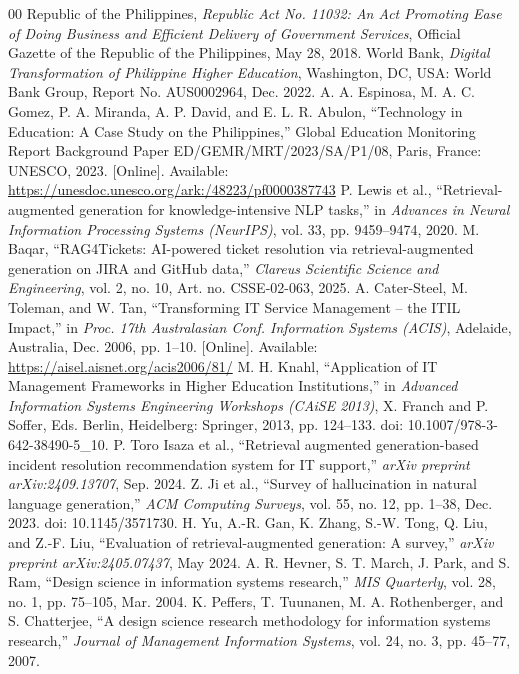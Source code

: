 \documentclass[conference]{IEEEtran}
\begin{document}
\begin{thebibliography}{00}
 Republic of the Philippines, \textit{Republic Act No. 11032: An Act Promoting Ease of Doing Business and Efficient Delivery of Government Services}, Official Gazette of the Republic of the Philippines, May 28, 2018.
 World Bank, \textit{Digital Transformation of Philippine Higher Education}, Washington, DC, USA: World Bank Group, Report No. AUS0002964, Dec. 2022.
 A. A. Espinosa, M. A. C. Gomez, P. A. Miranda, A. P. David, and E. L. R. Abulon, ``Technology in Education: A Case Study on the Philippines,'' Global Education Monitoring Report Background Paper ED/GEMR/MRT/2023/SA/P1/08, Paris, France: UNESCO, 2023. [Online]. Available: \url{https://unesdoc.unesco.org/ark:/48223/pf0000387743}
 P. Lewis et al., ``Retrieval-augmented generation for knowledge-intensive NLP tasks,'' in \textit{Advances in Neural Information Processing Systems (NeurIPS)}, vol. 33, pp. 9459--9474, 2020.
 M. Baqar, ``RAG4Tickets: AI-powered ticket resolution via retrieval-augmented generation on JIRA and GitHub data,'' \textit{Clareus Scientific Science and Engineering}, vol. 2, no. 10, Art. no. CSSE-02-063, 2025.
 A. Cater-Steel, M. Toleman, and W. Tan, ``Transforming IT Service Management -- the ITIL Impact,'' in \textit{Proc. 17th Australasian Conf. Information Systems (ACIS)}, Adelaide, Australia, Dec. 2006, pp. 1--10. [Online]. Available: \url{https://aisel.aisnet.org/acis2006/81/}
 M. H. Knahl, ``Application of IT Management Frameworks in Higher Education Institutions,'' in \textit{Advanced Information Systems Engineering Workshops (CAiSE 2013)}, X. Franch and P. Soffer, Eds. Berlin, Heidelberg: Springer, 2013, pp. 124--133. doi: 10.1007/978-3-642-38490-5\_10.
 P. Toro Isaza et al., ``Retrieval augmented generation-based incident resolution recommendation system for IT support,'' \textit{arXiv preprint arXiv:2409.13707}, Sep. 2024.
 Z. Ji et al., ``Survey of hallucination in natural language generation,'' \textit{ACM Computing Surveys}, vol. 55, no. 12, pp. 1--38, Dec. 2023. doi: 10.1145/3571730.
 H. Yu, A.-R. Gan, K. Zhang, S.-W. Tong, Q. Liu, and Z.-F. Liu, ``Evaluation of retrieval-augmented generation: A survey,'' \textit{arXiv preprint arXiv:2405.07437}, May 2024.
 A. R. Hevner, S. T. March, J. Park, and S. Ram, ``Design science in information systems research,'' \textit{MIS Quarterly}, vol. 28, no. 1, pp. 75--105, Mar. 2004.
 K. Peffers, T. Tuunanen, M. A. Rothenberger, and S. Chatterjee, ``A design science research methodology for information systems research,'' \textit{Journal of Management Information Systems}, vol. 24, no. 3, pp. 45--77, 2007.

\end{thebibliography}
\end{document}
